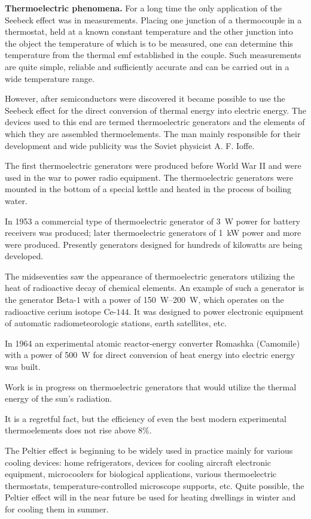 \textbf{Thermoelectric phenomena.} For a long time the only application of the Seebeck effect was in measurements. Placing one junction of a thermocouple in a thermostat, held at a known constant temperature
and the other junction into the object the temperature of which is to be measured, one can determine this temperature from the thermal emf established in the couple. Such measurements are quite simple, reliable and sufficiently accurate and can be carried out in a wide temperature range.

However, after semiconductors were discovered it became possible to use the Seebeck effect for the direct conversion of thermal energy into electric energy. The devices used to this end are termed thermoelectric generators and the elements of which they are assembled thermoelements. The man mainly responsible for their development and wide publicity was the Soviet physicist A. F. Ioffe.

The first thermoelectric generators were produced before World War II and were used in the war to power radio equipment. The thermoelectric generators were mounted in the bottom of a special kettle and heated in the process of boiling water.

In 1953 a commercial type of thermoelectric generator of \SI{3}{\watt} power for battery receivers was produced; later thermoelectric generators of \SI{1}{\kilo\watt} power and more were produced. Presently generators designed for hundreds of kilowatts are being developed.

The midseventies saw the appearance of thermoelectric generators utilizing the heat of radioactive decay of chemical elements. An example of such a generator is the generator Beta-$1$ with a power of \SIrange{150}{200}{\watt}, which operates on the radioactive cerium isotope Ce-$144$. It was designed to power electronic equipment of automatic radiometeorologic stations, earth satellites, etc.

In 1964 an experimental atomic reactor-energy converter Romashka (Camomile) with a power of \SI{500}{\watt} for direct conversion of heat energy into electric energy was built.

Work is in progress on thermoelectric generators that would utilize the thermal energy of the sun's radiation.

It is a regretful fact, but the efficiency of even the best modern experimental thermoelements does not rise above $8\%$.

The Peltier effect is beginning to be widely used in practice mainly for various cooling devices: home refrigerators, devices for cooling aircraft electronic equipment, microcoolers for biological applications, various thermoelectric thermostats, temperature-controlled microscope supports, etc. Quite possible, the Peltier effect will in the near future be used for heating dwellings in winter and for cooling them in summer.

